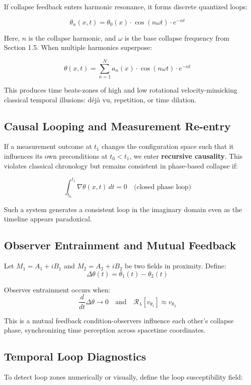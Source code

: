 If collapse feedback enters harmonic resonance, it forms discrete quantized loops:

\[
\theta_n(x,t) = \theta_0(x) \cdot \cos(n \omega t) \cdot e^{-\alpha t}
\]

Here, $n$ is the collapse harmonic, and $\omega$ is the base collapse frequency from Section 1.5. \cite{chapter_time} When multiple harmonics superpose:

\[
\theta(x,t) = \sum_{n=1}^{N} a_n(x) \cdot \cos(n \omega t) \cdot e^{-\alpha t}
\]

This produces time beats-zones of high and low rotational velocity-mimicking classical temporal illusions: déjà vu, repetition, or time dilation. \cite{chapter_time} \subsection*{Causal Looping and Measurement Re-entry}

If a measurement outcome at $t_1$ changes the configuration space such that it influences its own preconditions at $t_0 < t_1$, we enter \textbf{recursive causality}. \cite{chapter_time} This violates classical chronology but remains consistent in phase-based collapse if:

\[
\int_{t_0}^{t_1} \nabla \theta(x,t) \, dt = 0
\quad \text{(closed phase loop)}
\]

Such a system generates a consistent loop in the imaginary domain even as the timeline appears paradoxical. \cite{chapter_time} \subsection*{Observer Entrainment and Mutual Feedback}

Let $M_1 = A_1 + iB_1$ and $M_2 = A_2 + iB_2$ be two fields in proximity. \cite{chapter_time} Define:
\[
\Delta \theta(t) = \theta_1(t) - \theta_2(t)
\]

Observer entrainment occurs when:
\[
\frac{d}{dt} \Delta \theta \to 0
\quad \text{and} \quad
\mathcal{R}_\lambda[v_{\theta_1}] \approx v_{\theta_2}
\]

This is a mutual feedback condition-observers influence each other's collapse phase, synchronizing time perception across spacetime coordinates. \cite{chapter_time} \subsection*{Temporal Loop Diagnostics}

To detect loop zones numerically or visually, define the loop susceptibility field:

